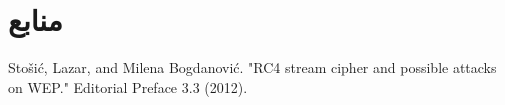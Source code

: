 \documentclass{article}
\begin{document}







\section*{منابع}
\renewcommand{\section}[2]{}%
\begin{thebibliography}{99} %


\begin{LTRitems}

\resetlatinfont

 Stošić, Lazar, and Milena Bogdanović. "RC4 stream cipher and possible attacks on WEP." Editorial Preface 3.3 (2012).
\end{LTRitems}

\end{thebibliography}
\end{document}
